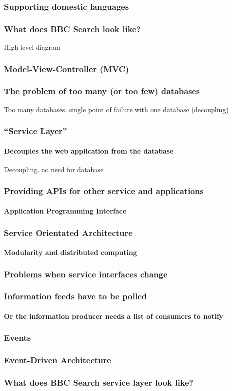 \documentclass{beamer}
\begin{document}
\begin{frame}
  \frametitle{Supporting domestic languages}
\end{frame}

\begin{frame}
  \frametitle{What does BBC Search look like?}
  High-level diagram
\end{frame}

\begin{frame}
  \frametitle{Model-View-Controller (MVC)}
\end{frame}

\begin{frame}
  \frametitle{The problem of too many (or too few) databases}
  Too many databases, single point of failure with one database (decoupling)
\end{frame}

\begin{frame}
  \frametitle{``Service Layer''}
  \framesubtitle{Decouples the web application from the database}
  Decoupling, no need for database
\end{frame}

\begin{frame}
  \frametitle{Providing APIs for other service and applications}
  \framesubtitle{Application Programming Interface}
\end{frame}

\begin{frame}
  \frametitle{Service Orientated Architecture}
  \framesubtitle{Modularity and distributed computing}
\end{frame}

\begin{frame}
  \frametitle{Problems when service interfaces change}
\end{frame}

\begin{frame}
  \frametitle{Information feeds have to be polled}
  \framesubtitle{Or the information producer needs a list of consumers to notify}
\end{frame}

\begin{frame}
  \frametitle{Events}
\end{frame}

\begin{frame}
  \frametitle{Event-Driven Architecture}
\end{frame}

\begin{frame}
  \frametitle{What does BBC Search service layer look like?}
\end{frame}
\end{document}
